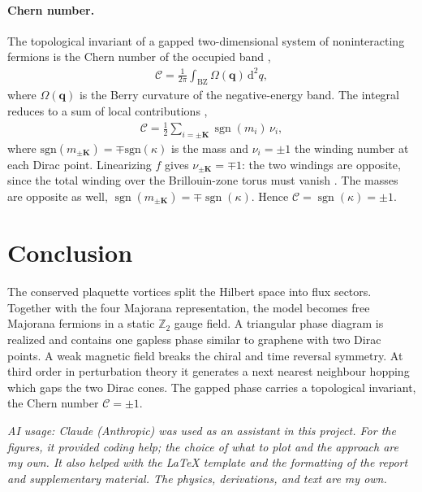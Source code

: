 \documentclass[
  aps,
  prl,
  reprint,
  amsmath,
  amssymb,
  superscriptaddress,
  floatfix
]{revtex4-2}
\renewcommand{\dd}{\mathrm{d}}
\begin{document}
\paragraph{Chern number.}
The topological invariant of a gapped two-dimensional system of noninteracting fermions is the Chern number of the occupied band \cite{TKNN1982},
\begin{align}
  \mathcal C = \frac{1}{2\pi}\int_{\text{BZ}}\Omega(\bm q)\,\dd^2q,
  \label{eq:chern_def}
\end{align}
where $\Omega(\bm q)$ is the Berry curvature of the negative-energy band. The integral reduces
to a sum of local contributions \cite{SM},
\begin{align}
  \mathcal C = \frac12\sum_{i=\pm\bm K}\operatorname{sgn}(m_i)\,\nu_i,
  \label{eq:chern_dirac}
\end{align}
where $\mathrm{sgn}(m_{\pm \bm K})= \mp \mathrm{sgn}(\kappa)$ is the mass and $\nu_i=\pm1$ the winding number at
each Dirac point. Linearizing $f$ gives $\nu_{\pm\bm K}=\mp1$: the two
windings are opposite, since the total winding over the
Brillouin-zone torus must vanish
\cite{NielsenNinomiya1981}. The masses are opposite as well,
$\operatorname{sgn}(m_{\pm\bm K})=\mp\operatorname{sgn}(\kappa)$. Hence
$\mathcal C = \operatorname{sgn}(\kappa)=\pm1$. 

\section{Conclusion}
\label{sec:conclusion}
The conserved plaquette vortices split the Hilbert space into flux sectors.
Together with the four Majorana representation, the model becomes free Majorana fermions in a static $\mathbb{Z}_2$ gauge field.
A triangular phase diagram is realized and contains one gapless phase similar to graphene with two Dirac points.
A weak magnetic field breaks the chiral and time reversal symmetry. At third order in perturbation theory it generates a next nearest neighbour hopping which gaps the two Dirac cones. The gapped phase carries a topological invariant, the Chern number $\mathcal{C}=\pm 1$.

\begin{acknowledgments}
  \emph{AI usage: Claude (Anthropic) was used as an assistant in this project.
For the figures, it provided coding help; the choice of what to plot and the
approach are my own. It also helped with the \LaTeX{} template and the formatting
of the report and supplementary material. The physics, derivations, and text are my own.}
\end{acknowledgments}



\end{document}
